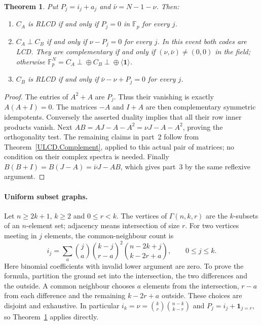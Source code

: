 \documentclass[11pt,a4paper]{article}
\newtheorem{theorem}{Theorem}[section]
\numberwithin{equation}{section}
\begin{document}
\begin{theorem}\label{ULCD.Scalar}
Put $P_j=i_j+a_j$ and $\bar\nu=N-1-\nu$. Then:
\begin{enumerate}
\item $C_A$ is RLCD if and only if $P_j=0$ in $\mathbb F_p$ for every $j$.
\item $C_A\perp C_B$ if and only if $\nu-P_j=0$ for every $j$.
In this event both codes are LCD. They are complementary if and only if
$(\nu,\bar\nu)\ne(0,0)$ in the field; otherwise
$\mathbb F_p^N=C_A\perp\!\oplus C_B\perp\!\oplus\langle\mathbf1\rangle$.
\item $C_B$ is RLCD if and only if $\bar\nu-\nu+P_j=0$ for every $j$.
\end{enumerate}
\end{theorem}
\begin{proof}
The entries of $A^2+A$ are $P_j$. Thus their vanishing is exactly
$A(A+I)=0$. The matrices $-A$ and $I+A$ are then complementary symmetric
idempotents. Conversely the asserted duality implies that all their row
inner products vanish. Next
$AB=AJ-A-A^2=\nu J-A-A^2$, proving the orthogonality test.
The remaining claims in part~2 follow from Theorem~\ref{ULCD.Complement}, applied
to this actual pair of matrices; no condition on their complex spectra is
needed. Finally $B(B+I)=B(J-A)=\bar\nu J-AB$, which gives part~3 by the
same reflexive argument.
\end{proof}

\paragraph{Uniform subset graphs.}
Let $n\geq2k+1$, $k\geq2$ and $0\leq r<k$. The vertices of $\Gamma(n,k,r)$
are the $k$-subsets of an $n$-element set; adjacency means intersection of
size $r$. For two vertices meeting in $j$ elements, the common-neighbour
count is
\begin{equation}\label{ULCD.SubsetCounts}
 i_j=\sum_a\binom ja\binom{k-j}{r-a}^{\!2}
                  \binom{n-2k+j}{k-2r+a},\qquad 0\leq j\leq k.
\end{equation}
Here binomial coefficients with invalid lower argument are zero.
To prove the formula, partition the ground set into the intersection,
the two differences and the outside. A common neighbour chooses $a$
elements from the intersection, $r-a$ from each difference and the remaining
$k-2r+a$ outside. These choices are disjoint and exhaustive.
In particular $i_k=\nu=\binom kr\binom{n-k}{k-r}$ and
$P_j=i_j+\mathbf1_{j=r}$, so Theorem~\ref{ULCD.Scalar} applies directly.
\end{document}
